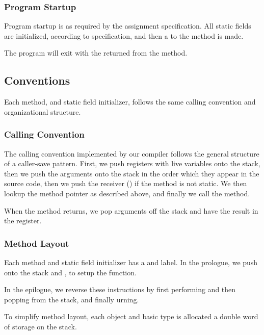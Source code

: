 \documentclass[pdftex,10pt,a4paper]{article}
\begin{document}
\subsubsection{Program Startup}

Program startup is as required by the assignment specification. All
static fields are initialized, according to specification, and then a
 to the  method is made.

The program will exit with the  returned from the
 method.

\subsection{Conventions}

Each method, and static field initializer, follows the same calling
convention and organizational structure.

\subsubsection{Calling Convention}

The calling convention implemented by our compiler follows the general
structure of a caller-save pattern. First, we push registers with live
variables onto the stack, then we push the arguments onto the stack in
the order which they appear in the source code, then we push the
receiver () if the method is not static. We then lookup the
method pointer as described above, and finally we call the method.

When the method returns, we pop arguments off the stack and have the
result in the  register.

\subsubsection{Method Layout}

Each method and static field initializer has a  and
 label. In the prologue, we push  onto the
stack and , to setup the function.

In the epilogue, we reverse these instructions by first performing
 and then popping  from the stack, and
finally urning.

To simplify method layout, each object and basic type is allocated a
double word of storage on the stack.
\end{document}
